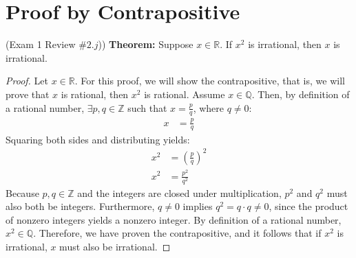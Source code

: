 \documentclass[12pt]{amsart}
\newcommand{\R}{\ensuremath{\mathbb{R}}}
\newcommand{\Z}{\ensuremath{\mathbb{Z}}}
\newcommand{\Q}{\ensuremath{\mathbb{Q}}}
\begin{document}
\section{Proof by Contrapositive}
{(Exam 1 Review $\#2.j$)) }
\textbf{Theorem:}{ Suppose $x \in \R$. If $x^2$ is irrational, then $x$ is irrational.}
\begin{proof}
    Let $x \in \R$. For this proof, we will show the contrapositive, that is, we will prove that $x$ is rational, then $x^2$ is rational. Assume $x \in \mathbb{Q}$. Then, by definition of a rational number, $\exists p,q \in \mathbb{Z}$ such that $x = \frac{p}{q}$, where $q \ne 0$:
    \begin{align*}
    x&=\frac{p}{q}
    \end{align*}
    Squaring both sides and distributing yields:
    \begin{align*}
    x^2&=(\frac{p}{q})^2 \\
    x^2&=\frac{p^2}{q^2} 
    \end{align*}
    Because $p,q \in \Z$ and the integers are closed under multiplication, $p^2$ and $q^2$ must also both be integers. Furthermore, $q \ne 0$ implies $q^2 =q \cdot q \ne 0$, since the product of nonzero integers yields a nonzero integer. By definition of a rational number, $x^2 \in \Q$. Therefore, we have proven the contrapositive, and it follows that if $x^2$ is irrational, $x$ must also be irrational.
\end{proof}
\newpage
\end{document}
